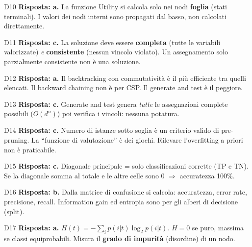 \documentclass[12pt,a4paper]{article}
\begin{document}
\begin{risposta}{D10}
\textbf{Risposta: a.} La funzione Utility si calcola solo nei nodi \textbf{foglia} (stati terminali). I valori dei nodi interni sono propagati dal basso, non calcolati direttamente.
\end{risposta}

\begin{risposta}{D11}
\textbf{Risposta: c.} La soluzione deve essere \textbf{completa} (tutte le variabili valorizzate) \emph{e} \textbf{consistente} (nessun vincolo violato). Un assegnamento solo parzialmente consistente non è una soluzione.
\end{risposta}

\begin{risposta}{D12}
\textbf{Risposta: a.} Il backtracking con commutatività è il più efficiente tra quelli elencati. Il backward chaining non è per CSP. Il generate and test è il peggiore.
\end{risposta}

\begin{risposta}{D13}
\textbf{Risposta: c.} Generate and test genera \emph{tutte} le assegnazioni complete possibili ($O(d^n)$) poi verifica i vincoli: nessuna potatura.
\end{risposta}

\begin{risposta}{D14}
\textbf{Risposta: c.} Numero di istanze sotto soglia è un criterio valido di pre-pruning. La ``funzione di valutazione'' è dei giochi. Rilevare l'overfitting a priori non è praticabile.
\end{risposta}

\begin{risposta}{D15}
\textbf{Risposta: c.} Diagonale principale = solo classificazioni corrette (TP e TN). Se la diagonale somma al totale e le altre celle sono 0 $\Rightarrow$ accuratezza 100\%.
\end{risposta}

\begin{risposta}{D16}
\textbf{Risposta: b.} Dalla matrice di confusione si calcola: accuratezza, error rate, precisione, recall. Information gain ed entropia sono per gli alberi di decisione (split).
\end{risposta}

\begin{risposta}{D17}
\textbf{Risposta: a.} $H(t) = -\sum_i p(i|t)\log_2 p(i|t)$. $H=0$ se puro, massima se classi equiprobabili. Misura il \textbf{grado di impurità} (disordine) di un nodo.
\end{risposta}
\end{document}
